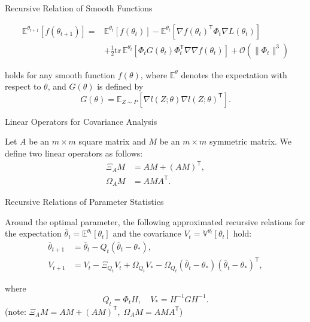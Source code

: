 \documentclass[fleqn,aspectratio=1610]{beamer}
\begin{document}
\begin{frame}[label={sec:org782dcb9}]{Recursive Relation of Smooth Functions}
\begin{lemma}[Amari, 1967]\label{sec:orgc259be7}
\nocite{Amari1967}

\begin{align}
  \mathbb{E}^{\theta_{t+1}}\left[f(\theta_{t+1})\right]%
  =&
     \mathbb{E}^{\theta_{t}}\left[f(\theta_{t})\right]
     -\mathbb{E}^{\theta_{t}}\left[\nabla f(\theta_{t})^{\mathsf{T}}\varPhi_{t}
     \nabla L(\theta_{t})\right]\\
   &+\frac{1}{2}\mathrm{tr}\,
     \mathbb{E}^{\theta_{t}}\left[
     \varPhi_{t}G(\theta_{t})\varPhi_{t}^{\mathsf{T}}\nabla\nabla f(\theta_{t})
     \right]
     +\mathcal{O}(\|\varPhi_{t}\|^3)
\end{align}

holds for any smooth function \(f(\theta)\),
where \(\mathbb{E}^{\theta}\) 
denotes the expectation with respect to \(\theta\),
and \(G(\theta)\) is defined by
\begin{equation}
  G(\theta)=
  \mathbb{E}_{Z\sim P}
  \left[\nabla l(Z;\theta)\nabla l(Z;\theta)^{\mathsf{T}}\right].
\end{equation}
\end{lemma}
\end{frame}
\begin{frame}[label={sec:orgf973cd3}]{Linear Operators for Covariance Analysis}
\begin{definition}[]\label{sec:org1b07b50}
Let \(A\) be an \(m\times m\) square matrix 
and \(M\) be an \(m\times m\) symmetric matrix.
We define two linear operators as follows:
\begin{align}
  \Xi_{A}M
  &= AM+(AM)^{\mathsf{T}},\\
  \Omega_{A}M
  &= AMA^{\mathsf{T}}.
\end{align}
\end{definition}
\end{frame}
\begin{frame}[label={sec:org5a6a437}]{Recursive Relations of Parameter Statistics}
\begin{lemma}[]\label{sec:org01e082f}
Around the optimal parameter,
the following approximated recursive relations for
the expectation \(\bar\theta_{t}=\mathbb{E}^{\theta_{t}}\left[\theta_{t}\right]\)
and the covariance \(V_{t}=\mathbb{V}^{\theta_{t}}\left[\theta_{t}\right]\)
hold:
\begin{align}
  \bar{\theta}_{t+1}
  &=\bar{\theta}_{t}
    -Q_{t}(\bar{\theta}_{t}-\theta_{*}),\\
  V_{t+1}
  &=V_{t}
    -\Xi_{Q_{t}}V_{t}
    +\Omega_{Q_{t}}V_{*}
    -\Omega_{Q_{t}}(\bar{\theta}_{t}-\theta_{*}) 
    (\bar{\theta}_{t}-\theta_{*})^{\mathsf{T}},
\end{align}

where
\begin{equation}
  Q_{t}=\varPhi_{t}H,\quad
  V_{*}=H^{-1}GH^{-1}.
\end{equation}
(note: \(\Xi_{A}M= AM+(AM)^{\mathsf{T}},\;\Omega_{A}M= AMA^{\mathsf{T}}\))
\end{lemma}
\end{frame}
\end{document}
